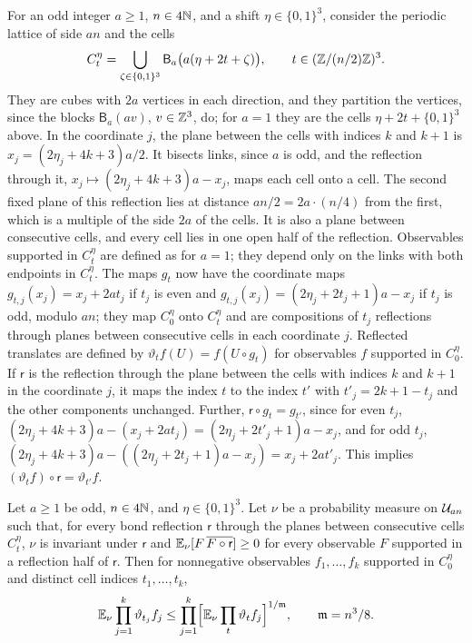 For an odd integer $a\ge1$, $n\in4\mathbb N$, and a shift $\eta\in\{0,1\}^3$, consider the periodic lattice of side $an$ and the cells
\[
 C^\eta_t=\bigcup_{\zeta\in\{0,1\}^3}\mathsf B_a\bigl(a(\eta+2t+\zeta)\bigr),\qquad t\in(\mathbb Z/(n/2)\mathbb Z)^3.
\]
They are cubes with $2a$ vertices in each direction, and they partition the vertices, since the blocks $\mathsf B_a(av)$, $v\in\mathbb Z^3$, do; for $a=1$ they are the cells $\eta+2t+\{0,1\}^3$ above. In the coordinate $j$, the plane between the cells with indices $k$ and $k+1$ is $x_j=(2\eta_j+4k+3)a/2$. It bisects links, since $a$ is odd, and the reflection through it, $x_j\mapsto(2\eta_j+4k+3)a-x_j$, maps each cell onto a cell. The second fixed plane of this reflection lies at distance $an/2=2a\cdot(n/4)$ from the first, which is a multiple of the side $2a$ of the cells. It is also a plane between consecutive cells, and every cell lies in one open half of the reflection. Observables supported in $C^\eta_t$ are defined as for $a=1$; they depend only on the links with both endpoints in $C^\eta_t$. The maps $g_t$ now have the coordinate maps $g_{t,j}(x_j)=x_j+2at_j$ if $t_j$ is even and $g_{t,j}(x_j)=(2\eta_j+2t_j+1)a-x_j$ if $t_j$ is odd, modulo $an$; they map $C^\eta_0$ onto $C^\eta_t$ and are compositions of $t_j$ reflections through planes between consecutive cells in each coordinate $j$. Reflected translates are defined by $\vartheta_tf(U)=f(U\circ g_t)$ for observables $f$ supported in $C^\eta_0$. If $\mathsf r$ is the reflection through the plane between the cells with indices $k$ and $k+1$ in the coordinate $j$, it maps the index $t$ to the index $t'$ with $t'_j=2k+1-t_j$ and the other components unchanged. Further, $\mathsf r\circ g_t=g_{t'}$, since for even $t_j$, $(2\eta_j+4k+3)a-(x_j+2at_j)=(2\eta_j+2t'_j+1)a-x_j$, and for odd $t_j$, $(2\eta_j+4k+3)a-((2\eta_j+2t_j+1)a-x_j)=x_j+2at'_j$. This implies $(\vartheta_tf)\circ\mathsf r=\vartheta_{t'}f$.

\begin{lemma}\label{ch03:lem:chessboard}
Let $a\ge1$ be odd, $n\in4\mathbb N$, and $\eta\in\{0,1\}^3$. Let $\nu$ be a probability measure on $\mathcal U_{an}$ such that, for every bond reflection $\mathsf r$ through the planes between consecutive cells $C^\eta_t$, $\nu$ is invariant under $\mathsf r$ and $\mathbb E_\nu[F\,\overline{F\circ\mathsf r}]\ge0$ for every observable $F$ supported in a reflection half of $\mathsf r$. Then for nonnegative observables $f_1,\dots,f_k$ supported in $C^\eta_0$ and distinct cell indices $t_1,\dots,t_k$,
\[
 \mathbb E_\nu\prod_{j=1}^k\vartheta_{t_j}f_j\le\prod_{j=1}^k\Bigl[\mathbb E_\nu\prod_t\vartheta_tf_j\Bigr]^{1/\mathfrak m},\qquad\mathfrak m=n^3/8.
\]
\end{lemma}

